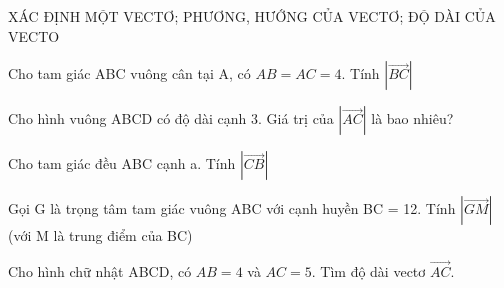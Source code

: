 \begin{dang}{XÁC ĐỊNH MỘT VECTƠ; PHƯƠNG, HƯỚNG CỦA VECTƠ; ĐỘ DÀI CỦA VECTO}
    \begin{vd}
        Cho tam giác ABC vuông cân tại A, có $AB = AC = 4$. Tính $|\vec{BC}|$
    \end{vd}

    \begin{vd}
        Cho hình vuông ABCD có độ dài cạnh 3. Giá trị của $|\vec{AC}|$ là bao nhiêu?
    \end{vd}

    \begin{vd}
        Cho tam giác đều ABC cạnh a. Tính $|\vec{CB}|$
    \end{vd}

    \begin{vd}
        Gọi G là trọng tâm tam giác vuông ABC với cạnh huyền BC = 12. Tính $|\vec{GM}|$ (với M là trung điểm của BC)
    \end{vd}

    \begin{vd}
        Cho hình chữ nhật ABCD, có $AB = 4$ và $AC = 5$. Tìm độ dài vectơ $\vec{AC}$.
    \end{vd}
\end{dang}

